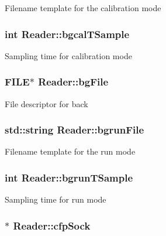Filename template for the calibration mode \hypertarget{classReader_aa98bab20153537c112ca0640c210c34b}{
\subsubsection[{bgcal\-T\-Sample}]{\setlength{\rightskip}{0pt plus 5cm}int Reader\-::bgcal\-T\-Sample\hspace{0.3cm}{\ttfamily [private]}}}\label{classReader_aa98bab20153537c112ca0640c210c34b}
Sampling time for calibration mode \hypertarget{classReader_aa0296167e6f6781808727fa2a93b6a74}{
\subsubsection[{bg\-File}]{\setlength{\rightskip}{0pt plus 5cm}F\-I\-L\-E$\ast$ Reader\-::bg\-File\hspace{0.3cm}{\ttfamily [private]}}}\label{classReader_aa0296167e6f6781808727fa2a93b6a74}
File descriptor for back \hypertarget{classReader_a7e985019f1cb999712f0955e0febf4ef}{
\subsubsection[{bgrun\-File}]{\setlength{\rightskip}{0pt plus 5cm}std\-::string Reader\-::bgrun\-File\hspace{0.3cm}{\ttfamily [private]}}}\label{classReader_a7e985019f1cb999712f0955e0febf4ef}
Filename template for the run mode \hypertarget{classReader_a1fa6f7582327f96076165c7b95b55a1b}{
\subsubsection[{bgrun\-T\-Sample}]{\setlength{\rightskip}{0pt plus 5cm}int Reader\-::bgrun\-T\-Sample\hspace{0.3cm}{\ttfamily [private]}}}\label{classReader_a1fa6f7582327f96076165c7b95b55a1b}
Sampling time for run mode \hypertarget{classReader_a4cbb3ab4b903d0114ee8f6ea521259b8}{
\subsubsection[{cfp\-Sock}]{$\ast$ Reader\-::cfp\-Sock\hspace{0.3cm}{\ttfamily [private]}}}\label{classReader_a4cbb3ab4b903d0114ee8f6ea521259b8}
